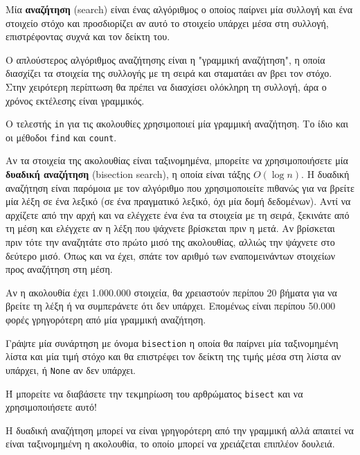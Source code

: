 \documentclass[10pt]{book}
\begin{document}
Μία {\bf αναζήτηση} (search) είναι ένας αλγόριθμος ο οποίος παίρνει μία συλλογή και ένα στοιχείο
στόχο και προσδιορίζει αν αυτό το στοιχείο υπάρχει μέσα στη συλλογή, επιστρέφοντας συχνά και τον
δείκτη του.

Ο απλούστερος αλγόριθμος αναζήτησης είναι η "γραμμική αναζήτηση", η οποία διασχίζει τα στοιχεία
της συλλογής με τη σειρά και σταματάει αν βρει τον στόχο.  Στην χειρότερη περίπτωση θα πρέπει να
διασχίσει ολόκληρη τη συλλογή, άρα ο χρόνος εκτέλεσης είναι γραμμικός.

Ο τελεστής {\tt in} για τις ακολουθίες χρησιμοποιεί μία γραμμική αναζήτηση. 
Το ίδιο και οι μέθοδοι {\tt find} και {\tt count}. 

Αν τα στοιχεία της ακολουθίας είναι ταξινομημένα, μπορείτε να χρησιμοποιήσετε μία {\bf δυαδική αναζήτηση} 
(bisection search), η οποία είναι τάξης $O(\log n)$.  Η δυαδική αναζήτηση είναι παρόμοια με τον αλγόριθμο που χρησιμοποιείτε πιθανώς για να βρείτε μία λέξη σε ένα λεξικό (σε ένα πραγματικό λεξικό, όχι μία δομή δεδομένων).
Αντί να αρχίζετε από την αρχή και να ελέγχετε ένα ένα τα στοιχεία με τη σειρά, ξεκινάτε από τη μέση και
ελέγχετε αν η λέξη που ψάχνετε βρίσκεται πριν η μετά.  Αν βρίσκεται πριν τότε την αναζητάτε στο πρώτο μισό της ακολουθίας, αλλιώς την ψάχνετε στο δεύτερο μισό.  Όπως και να έχει, σπάτε τον αριθμό των εναπομεινάντων στοιχείων
προς αναζήτηση στη μέση.

Αν η ακολουθία έχει 1.000.000 στοιχεία, θα χρειαστούν περίπου 20 βήματα για να βρείτε τη λέξη ή να συμπεράνετε
ότι δεν υπάρχει.  Επομένως είναι περίπου 50.000 φορές γρηγορότερη από μία γραμμική αναζήτηση.
\\

\begin{exercise}

Γράψτε μία συνάρτηση με όνομα {\tt bisection} η οποία θα παίρνει μία ταξινομημένη λίστα και μία τιμή στόχο
και θα επιστρέφει τον δείκτη της τιμής μέσα στη λίστα αν υπάρχει, ή {\tt None} αν δεν υπάρχει.

Ή μπορείτε να διαβάσετε την τεκμηρίωση του αρθρώματος {\tt bisect} και να χρησιμοποιήσετε αυτό!
\end{exercise}

Η δυαδική αναζήτηση μπορεί να είναι γρηγορότερη από την γραμμική αλλά απαιτεί να είναι ταξινομημένη η
ακολουθία, το οποίο μπορεί να χρειάζεται επιπλέον δουλειά.
\end{document}
